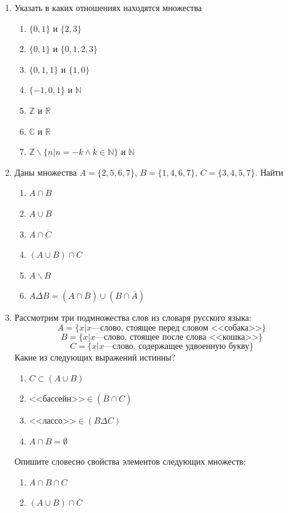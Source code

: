 \begin{enumerate}
    \item Указать в каких отношениях находятся множества
    \begin{enumerate}
        \item $\{0,1\}$ и $\{2,3\}$
        \item $\{0,1\}$ и $\{0,1,2,3\}$
        \item $\{0,1,1\}$ и $\{1,0\}$
        \item $\{-1,0,1\}$ и $\mathbb{N}$
        \item $\mathbb{Z}$ и $\mathbb{R}$
        \item $\mathbb{C}$ и $\mathbb{R}$
        \item $\mathbb{Z}\backslash\{n|n=-k\land k\in\mathbb{N}\}$ и $\mathbb{N}$
    \end{enumerate}
    
    \item Даны множества $A=\{2,5,6,7\}$, $B=\{1,4,6,7\}$, $C=\{3,4,5,7\}$. Найти
    \begin{enumerate}
        \item $A\cap B$
        \item $A\cup B$
        \item $A\cap \overline{C}$
        \item $(A\cup B)\cap C$
        \item $A\backslash B$
        \item $A\Delta B = (A\cap \overline{B})\cup(B\cap\overline{A})$
    \end{enumerate}
    
    \item Рассмотрим три подмножества слов из словаря русского языка:
    \[A=\{x|x\text{---слово, стоящее перед словом <<собака>>}\}\]
    \[B=\{x|x\text{---слово, стоящее после слова  <<кошка>>}\}\]
    \[C=\{x|x\text{---слово, содержащее удвоенную букву}\}\]
    Какие из следующих выражений истинны?
    \begin{enumerate}
        \item $C\subset(A\cup B)$
        \item $\text{<<бассейн>>}\in (\overline{B}\cap C)$
        \item $\text{<<лассо>>}\in (B\Delta C)$
        \item $A\cap B=\emptyset$
    \end{enumerate}
    Опишите словесно свойства элементов следующих множеств:
    \begin{enumerate}
        \item $A\cap B \cap C$
        \item $(A\cup B)\cap \overline{C}$
    \end{enumerate}
    

\end{enumerate}
